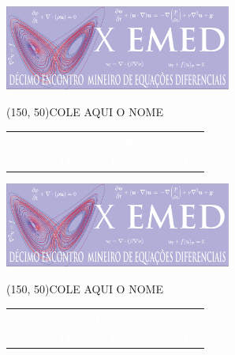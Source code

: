 \documentclass{article}
\begin{document}
\BgThispage
{
	\noindent
	\begin{minipage}{7.6cm}
		\vspace{-3em}
		\hspace{-1em}
		\includegraphics[width=7.45cm]{emed.png}
	\vspace{1.7cm}
		\begin{center}
		\framebox(150, 50){COLE AQUI O NOME } \par 
		\end{center}
		\vspace{1.8cm}

		\hspace{-1.4em}
		\renewcommand{\arraystretch}{3.00}
		\begin{tabular}{c}
		\cellcolor{lightpastelpurple}  
			\textcolor{white}{{\textbf{\Large Participante}}}\\
			\cellcolor{Black}      
			\textcolor{white}{{\textbf{\large 03 a 05/11/2016, Uberlândia-MG}}}  
		\end{tabular}
	\end{minipage}
}
\newpage
\BgThispage
{
	\noindent
	\begin{minipage}{7.6cm}
		\vspace{-3em}
		\hspace{-1em}
		\includegraphics[width=7.45cm]{emed.png}
	\vspace{1.7cm}
		\begin{center}
		\framebox(150, 50){COLE AQUI O NOME } \par 
		\end{center}
		\vspace{1.8cm}
		\hspace{-1.4em}
		\renewcommand{\arraystretch}{3.00}
		\begin{tabular}{c}
		\cellcolor{lightpastelpurple}  
			\textcolor{white}{{\textbf{\Large Comissão Organizadora}}}\\
			\cellcolor{Black}      
			\textcolor{white}{{\textbf{\large 03 a 05/11/2016, Uberlândia-MG}}}  
		\end{tabular}
	\end{minipage}
}
\end{document}
